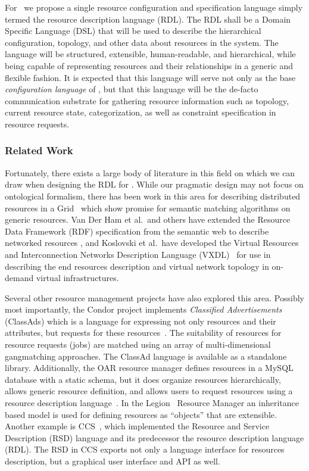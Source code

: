 For \ngrm\ we propose a single resource configuration and
specification language simply termed the resource description
language (RDL).  The RDL shall be a Domain
Specific Language (DSL) that will be used to describe the
hierarchical configuration, topology, and other data about
resources in the system. The language will be structured, extensible,
human-readable, and hierarchical, while being capable of
representing resources and their relationships in a generic and
flexible fashion. It is expected that this language will serve not
only as the base \emph{configuration language} of \ngrm, but that
this language will be the de-facto communication substrate for
gathering resource information such as topology, current resource
state, categorization, as well as constraint specification in
resource requests.

\subsubsection{Related Work}

Fortunately, there exists a large body of literature in this
field on which we can draw when designing the RDL for \ngrm.
While our pragmatic design may not focus on ontological formalism,
there has been work in this area for describing distributed resources
in a Grid~\cite{Castano:2004, Pernas:2005, Koning:2011:UOR:1998662.1998819}
which show promise for semantic matching algorithms on generic resources.
Van Der Ham et al.\ and others have extended the Resource Data Framework (RDF)
specification from the semantic web to describe networked resources
\cite{vanderHam:2006:URD:1160256.1160260, VanDerHam:2008:DTI:2285568.2285672, vanderHam:2006:SHN:1188455.1188643},
and Koslovski et al.\ have developed the Virtual Resources and
Interconnection Networks Description Language (VXDL)~\cite{Koslovski_Primet_2009} for use in
describing the end resources description and virtual network
topology in on-demand virtual infrastructures.

Several other resource management projects have also explored this
area. Possibly most importantly, the Condor project implements
\emph{Classified Advertisements} (ClassAds) which is a language
for expressing not only resources and their attributes, but
requests for these resources~\cite{ClassAd}. The suitability
of resources for resource requests (jobs) are matched using an
array of multi-dimensional gangmatching approaches. The ClassAd
language is available as a standalone library. Additionally, the
OAR resource manager defines resources in a MySQL database with
a static schema, but it does organize resources hierarchically,
allows generic resource definition, and allows users to request
resources using a resource description language~\cite{Oar}. In
the Legion~\cite{LegionGrid,LegionRM} Resource Manager an
inheritance based model is used for defining resources as ``objects''
that are extensible. Another example is CCS~\cite{Keller98ccsresource},
which implemented the Resource and Service Description (RSD)
language and its predecessor the resource description language (RDL).
The RSD in CCS exports not only a language interface for resources
description, but a graphical user interface and API as well.


